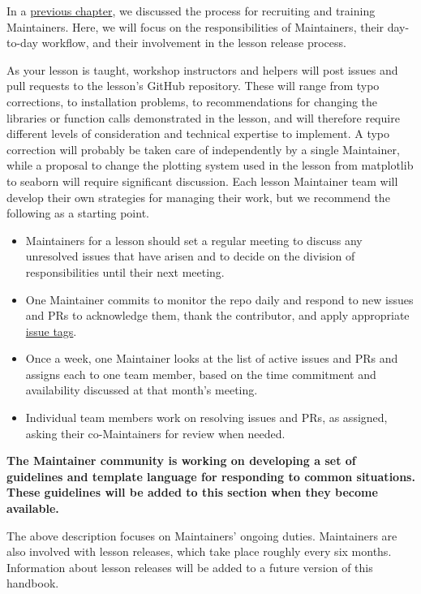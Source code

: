 \documentclass[
]{book}
\providecommand{\tightlist}{%
  \setlength{\itemsep}{0pt}\setlength{\parskip}{0pt}}
\begin{document}
In a \href{community-development-roles\#lesson-maintainers}{previous chapter}, we discussed the process for recruiting and training Maintainers. Here, we
will focus on the responsibilities of Maintainers, their day-to-day workflow, and their involvement
in the lesson release process.

As your lesson is taught, workshop instructors and helpers will post issues and pull requests to
the lesson's GitHub repository. These will range from typo corrections, to installation problems,
to recommendations for changing the libraries or function calls demonstrated in the lesson, and will
therefore require different levels of consideration and technical expertise to implement. A typo
correction will probably be taken care of independently by a single Maintainer,
while a proposal to change
the plotting system used in the lesson from matplotlib to seaborn will require significant
discussion. Each lesson Maintainer team will develop their own strategies for managing their work,
but we recommend the following as a starting point.

\begin{itemize}
\tightlist
\item
  Maintainers for a lesson should set a regular meeting to discuss any unresolved issues that have arisen and to decide on the division of responsibilities until
  their next meeting.
\item
  One Maintainer commits to monitor the repo daily and respond to new issues and PRs to acknowledge them,
  thank the contributor, and apply appropriate \href{https://docs.carpentries.org/topic_folders/maintainers/github_labels.html}{issue tags}.
\item
  Once a week, one Maintainer looks at the list of active issues and PRs and assigns each to one team member, based on the time commitment and availability discussed at that month's meeting.
\item
  Individual team members work on resolving issues and PRs, as assigned, asking
  their co-Maintainers for review when needed.
\end{itemize}

\textbf{The Maintainer community is working on developing a set of guidelines and template
language for responding to common situations. These guidelines will be added
to this section when they become available.}

The above description focuses on Maintainers' ongoing duties. Maintainers are
also involved with lesson releases, which take place roughly every six months.
Information about lesson releases will be added to a future version of this
handbook.
\end{document}
